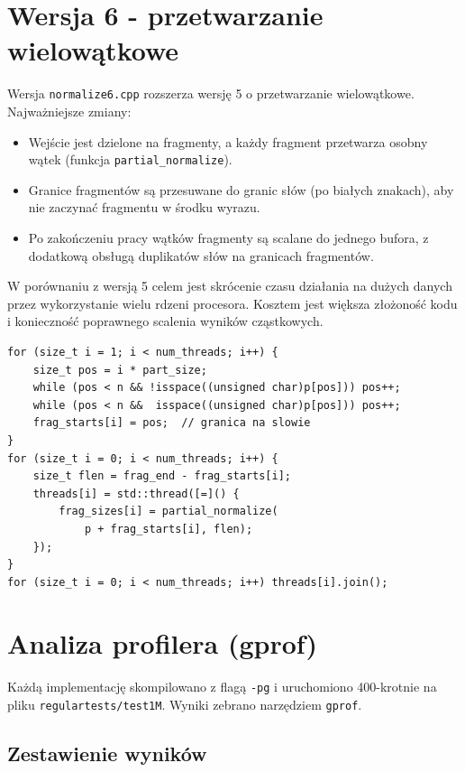 \documentclass{article}
\begin{document}
\section{Wersja 6 - przetwarzanie wielowątkowe}
Wersja \texttt{normalize6.cpp} rozszerza wersję 5 o przetwarzanie wielowątkowe. Najważniejsze zmiany:
\begin{itemize}
    \item Wejście jest dzielone na fragmenty, a każdy fragment przetwarza osobny wątek (funkcja \texttt{partial\_normalize}).
    \item Granice fragmentów są przesuwane do granic słów (po białych znakach), aby nie zaczynać fragmentu w środku wyrazu.
    \item Po zakończeniu pracy wątków fragmenty są scalane do jednego bufora, z dodatkową obsługą duplikatów słów na granicach fragmentów.
\end{itemize}
W porównaniu z wersją 5 celem jest skrócenie czasu działania na dużych danych przez wykorzystanie wielu rdzeni procesora. Kosztem jest większa złożoność kodu i konieczność poprawnego scalenia wyników cząstkowych.

\begin{lstlisting}[caption={Podział na oddzielne zadania dla wątków w \texttt{normalize\_string} w wersji 6}]
for (size_t i = 1; i < num_threads; i++) {
    size_t pos = i * part_size;
    while (pos < n && !isspace((unsigned char)p[pos])) pos++;
    while (pos < n &&  isspace((unsigned char)p[pos])) pos++;
    frag_starts[i] = pos;  // granica na slowie
}
for (size_t i = 0; i < num_threads; i++) {
    size_t flen = frag_end - frag_starts[i];
    threads[i] = std::thread([=]() {
        frag_sizes[i] = partial_normalize(
            p + frag_starts[i], flen);
    });
}
for (size_t i = 0; i < num_threads; i++) threads[i].join();
\end{lstlisting}
\newpage
\section{Analiza profilera (gprof)}

Każdą implementację skompilowano z flagą \texttt{-pg} i uruchomiono 400-krotnie na pliku \texttt{regulartests/test1M}.
Wyniki zebrano narzędziem \texttt{gprof}.

\subsection*{Zestawienie wyników}
\end{document}
